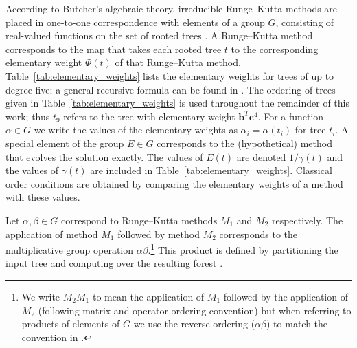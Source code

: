 According to Butcher's algebraic theory, irreducible Runge--Kutta methods
are placed in one-to-one correspondence with elements of a group
$G$, consisting of real-valued functions on the set of rooted trees \cite[Theorem~384A]{Butcher2008_book}.
A Runge--Kutta method corresponds to the map that takes each rooted tree $t$
to the corresponding elementary weight $\Phi(t)$ of that Runge--Kutta method.
Table~\ref{tab:elementary_weights} lists the elementary weights for trees of
up to degree five; a general recursive formula can be found in
\cite[Definition~312A]{Butcher2008_book}.
The ordering of trees given in Table~\ref{tab:elementary_weights} is used
throughout the remainder of this work; thus $t_9$ refers to the tree with
elementary weight $\bm{b}^T \bm{c}^4$.
For a function $\alpha \in G$ we write the values of the
elementary weights as $\alpha_{i} = \alpha(t_{i})$ for tree $t_{i}$.
A special element of the group $E \in G$ corresponds to the
(hypothetical) method that evolves the solution exactly.
The values of $E(t)$ are denoted $1/\gamma(t)$ \cite{Butcher2008_book}
and the values of $\gamma(t)$ are included in
Table~\ref{tab:elementary_weights}.
Classical order conditions are obtained by comparing the elementary weights 
of a method with these values.

Let $\alpha, \beta \in G$ correspond to Runge--Kutta methods $M_1$ and $M_2$
respectively.
The application of method $M_1$ followed by method $M_2$ corresponds to
the multiplicative group operation $\alpha\beta$.\footnote{We write
	$M_2M_1$ to mean the application of $M_1$
	followed by the application of $M_2$
	(following matrix and operator ordering convention)
	but when referring to products of elements of $G$
        we use the reverse ordering ($\alpha\beta$)
	to match the convention in \cite{Butcher2008_book}.}
This product is defined by partitioning the input tree and computing
over the resulting forest \cite[\S~383]{Butcher2008_book}.

